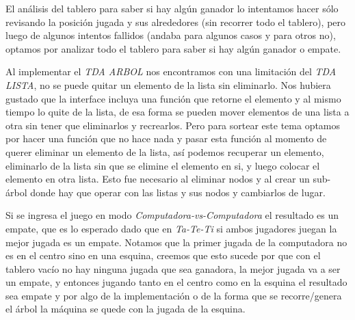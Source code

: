 \documentclass[12pt,a4paper]{article}
\begin{document}
El an\'alisis del tablero para saber si hay alg\'un ganador lo intentamos hacer s\'olo revisando la posici\'on jugada y sus alrededores (sin recorrer todo el tablero), pero luego de algunos intentos fallidos (andaba para algunos casos y para otros no), optamos por analizar todo el tablero para saber si hay alg\'un ganador o empate.

Al implementar el \emph{TDA ARBOL} nos encontramos con una limitaci\'on del \emph{TDA LISTA}, no se puede quitar un elemento de la lista sin eliminarlo. Nos hubiera gustado que la interface incluya una funci\'on que retorne el elemento y al mismo tiempo lo quite de la lista, de esa forma se pueden mover elementos de una lista a otra sin tener que eliminarlos y recrearlos. Pero para sortear este tema optamos por hacer una funci\'on que no hace nada y pasar esta funci\'on al momento de querer eliminar un elemento de la lista, as\'i podemos recuperar un elemento, eliminarlo de la lista sin que se elimine el elemento en si, y luego colocar el elemento en otra lista. Esto fue necesario al eliminar nodos y al crear un sub-\'arbol donde hay que operar con las listas y sus nodos y cambiarlos de lugar.

Si se ingresa el juego en modo \emph{Computadora-vs-Computadora} el resultado es un empate, que es lo esperado dado que en \emph{Ta-Te-Ti} si ambos jugadores juegan la mejor jugada es un empate. Notamos que la primer jugada de la computadora no es en el centro sino en una esquina, creemos que esto sucede por que con el tablero vac\'io no hay ninguna jugada que sea ganadora, la mejor jugada va a ser un empate, y entonces jugando tanto en el centro como en la esquina el resultado sea empate y por algo de la implementaci\'on o de la forma que se recorre/genera el \'arbol la m\'aquina se quede con la jugada de la esquina.
\end{document}
